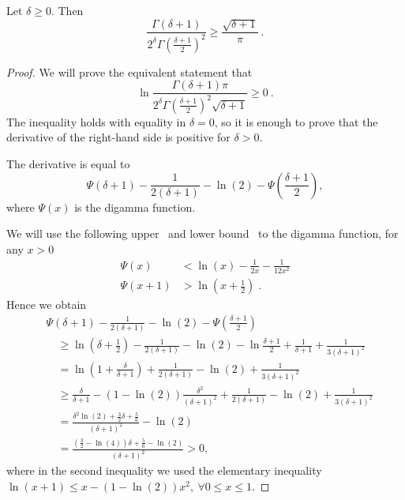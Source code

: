 \begin{lemma}
\label{lemma:ratio_gamma}
Let $\delta \geq 0$. Then
\[
\frac{\Gamma(\delta+1)}{2^\delta \Gamma(\frac{\delta+1}{2})^2}
\geq \frac{\sqrt{\delta+1}}{\pi}~.
\]
\end{lemma}
%
\begin{proof}
We will prove the equivalent statement that
\[
\ln \frac{\Gamma(\delta+1) \pi}{2^\delta \Gamma(\frac{\delta+1}{2})^2 \sqrt{\delta+1}} \geq 0~.
\]
The inequality holds with equality in $\delta=0$, so it is enough to prove
that the derivative of the right-hand side is positive for $\delta > 0$.

The derivative is equal to
\[
\Psi(\delta+1) - \frac{1}{2(\delta+1)} -\ln(2) - \Psi\left(\frac{\delta+1}{2} \right),
\]
where $\Psi(x)$ is the digamma function.

We will use the following upper~\citep{Chen05} and lower bound~\citep{Batir08} to the digamma function, for any $x>0$
\begin{align*}
\Psi(x) &< \ln(x) -\frac{1}{2x} -\frac{1}{12 x^2}\\
\Psi(x+1) &> \ln(x+\frac{1}{2}) \; .
\end{align*}
Hence we obtain
\begin{align*}
&\Psi(\delta+1) - \frac{1}{2(\delta+1)} -\ln(2) -\Psi(\frac{\delta+1}{2}) \\
&\quad \geq \ln(\delta+\frac{1}{2})- \frac{1}{2(\delta+1)} -\ln(2) -\ln\frac{\delta+1}{2} +\frac{1}{\delta+1} +\frac{1}{3 (\delta+1)^2} \\
&\quad = \ln(1+\frac{\delta}{\delta+1})+ \frac{1}{2(\delta+1)} -\ln(2)+\frac{1}{3 (\delta+1)^2} \\
&\quad \geq \frac{\delta}{\delta+1} - (1-\ln(2))\frac{\delta^2}{(\delta+1)^2}+ \frac{1}{2(\delta+1)} -\ln(2)+\frac{1}{3 (\delta+1)^2}\\
&\quad = \frac{\delta^2 \ln(2)+\frac{3}{2}\delta +\frac{5}{6}}{(\delta+1)^2} - \ln(2)\\
&\quad = \frac{(\frac{3}{2}-\ln(4)) \delta +\frac{5}{6}-\ln(2)}{(\delta+1)^2} >0,
\end{align*}
where in the second inequality we used the elementary inequality $\ln(x+1) \leq x - (1-\ln(2))x^2, \ \forall 0\leq x \leq 1$.
\end{proof}

